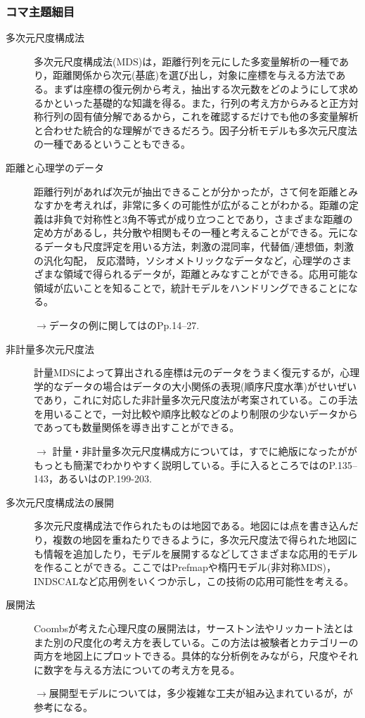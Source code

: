 \subsubsection{コマ主題細目}
\begin{description}
	\item[多次元尺度構成法] 多次元尺度構成法(MDS)は，距離行列を元にした多変量解析の一種であり，距離関係から次元(基底)を選び出し，対象に座標を与える方法である。まずは座標の復元例から考え，抽出する次元数をどのようにして求めるかといった基礎的な知識を得る。また，行列の考え方からみると正方対称行列の固有値分解であるから，これを確認するだけでも他の多変量解析と合わせた統合的な理解ができるだろう。因子分析モデルも多次元尺度法の一種であるということもできる。



	\item[距離と心理学のデータ] 距離行列があれば次元が抽出できることが分かったが，さて何を距離とみなすかを考えれば，非常に多くの可能性が広がることがわかる。距離の定義は非負で対称性と3角不等式が成り立つことであり，さまざまな距離の定め方があるし，共分散や相関もその一種と考えることができる。元になるデータも尺度評定を用いる方法，刺激の混同率，代替価/連想価，刺激の汎化勾配，    反応潜時，ソシオメトリックなデータなど，心理学のさまざまな領域で得られるデータが，距離とみなすことができる。応用可能な領域が広いことを知ることで，統計モデルをハンドリングできることになる。
	      \begin{flushright}
		      $\to$データの例に関しては\textcite{Takane198002}のPp.14--27.
	      \end{flushright}
	\item[非計量多次元尺度法] 計量MDSによって算出される座標は元のデータをうまく復元するが，心理学的なデータの場合はデータの大小関係の表現(順序尺度水準)がせいぜいであり，これに対応した非計量多次元尺度法が考案されている。この手法を用いることで，一対比較や順序比較などのより制限の少ないデータからであっても数量関係を導き出すことができる。
	      \begin{flushright}
		      $\to$ 計量・非計量多次元尺度構成方については，すでに絶版になったが\textcite{Okada19940115}がもっとも簡潔でわかりやすく説明している。手に入るところでは\textcite{Adachi200607}のP.135--143，あるいは\textcite{kosugi2019b}のP.199-203.
	      \end{flushright}
	\item[多次元尺度構成法の展開]多次元尺度構成法で作られたものは地図である。地図には点を書き込んだり，複数の地図を重ねたりできるように，多次元尺度法で得られた地図にも情報を追加したり，モデルを展開するなどしてさまざまな応用的モデルを作ることができる。ここではPrefmapや楕円モデル(非対称MDS)，INDSCALなど応用例をいくつか示し，この技術の応用可能性を考える。
	\item[展開法] Coombsが考えた心理尺度の展開法は，サーストン法やリッカート法とはまた別の尺度化の考え方を表している。この方法は被験者とカテゴリーの両方を地図上にプロットできる。具体的な分析例をみながら，尺度やそれに数字を与える方法についての考え方を見る。
	      \begin{flushright}
		      $\to$展開型モデルについては，多少複雑な工夫が組み込まれているが，\textcite{shimizu2018}が参考になる。
	      \end{flushright}


\end{description}
